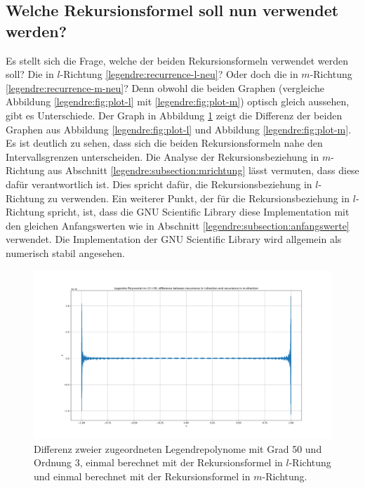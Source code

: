 \subsection{Welche Rekursionsformel soll nun verwendet werden?
\label{legendre:subsection:welche}}
Es stellt sich die Frage, welche der beiden Rekursionsformeln verwendet werden soll?
Die in $l$-Richtung \eqref{legendre:recurrence-l-neu}? Oder doch die in $m$-Richtung \eqref{legendre:recurrence-m-neu}?
Denn obwohl die beiden Graphen (vergleiche Abbildung \ref{legendre:fig:plot-l} mit \ref{legendre:fig:plot-m}) optisch gleich aussehen, gibt es Unterschiede.
Der Graph in Abbildung \ref{legendre:fig:plot-diff} zeigt die Differenz der beiden Graphen aus Abbildung \ref{legendre:fig:plot-l} und Abbildung \ref{legendre:fig:plot-m}.
Es ist deutlich zu sehen, dass sich die beiden Rekursionsformeln nahe den Intervallsgrenzen unterscheiden.
Die Analyse der Rekursionsbeziehung in $m$-Richtung aus Abschnitt \ref{legendre:subsection:mrichtung} lässt vermuten, dass diese dafür verantwortlich ist.
Dies spricht dafür, die Rekursionsbeziehung in $l$-Richtung zu verwenden.
Ein weiterer Punkt, der für die Rekursionsbeziehung in $l$-Richtung spricht, ist, dass die GNU Scientific Library \cite{legendre:gsl} diese Implementation mit den gleichen Anfangswerten wie in Abschnitt \ref{legendre:subsection:anfangswerte} verwendet.
Die Implementation der GNU Scientific Library wird allgemein als numerisch stabil angesehen.
\begin{figure}[!h]
\centering
\includegraphics[width=1.0\linewidth]{papers/legendre/plots/plot_diff_l_m}
\caption{Differenz zweier zugeordneten Legendrepolynome mit Grad 50 und Ordnung 3, einmal berechnet mit der Rekursionsformel in \texorpdfstring{$l$}{l}-Richtung und einmal berechnet mit der Rekursionsformel in \texorpdfstring{$m$}{m}-Richtung.}
\label{legendre:fig:plot-diff}
\end{figure}
